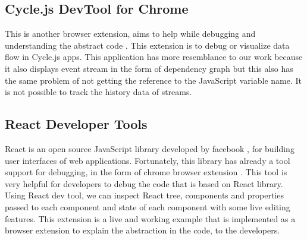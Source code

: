 \subsection{Cycle.js DevTool for Chrome}
This is another browser extension, aims to help while debugging and understanding the abstract code \citep{GithubCycleJsDevtool}. This extension is to debug or visualize data flow in Cycle.js \citep{CycleJs} apps. This application has more resemblance to our work because it also displays event stream in the form of dependency graph but this also has the same problem of not getting the reference to the JavaScript variable name. It is not possible to track the history data of streams.

\subsection{React Developer Tools}
React is an open source JavaScript library developed by facebook \citep{ReactFacebook}, for building user interfaces of web applications. Fortunately, this library has already a tool support for debugging, in the form of chrome browser extension \citep{ReactFacebookChrome}. This tool is very helpful for developers to debug the code that is based on React library. Using React dev tool, we can inspect React tree, components and properties passed to each component and state of each component with some live editing features. This extension is a live and working example that is implemented as a browser extension to explain the abstraction in the code, to the developers.



